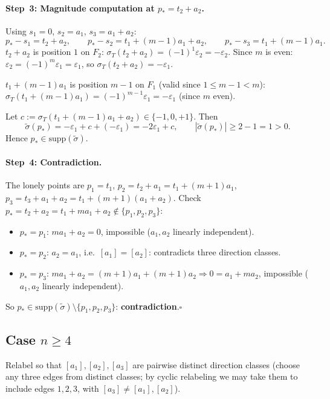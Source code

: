 \paragraph{Step~3: Magnitude computation at $p_*=t_2+a_2$.}
Using $s_1=0$, $s_2=a_1$, $s_3=a_1+a_2$:
\[
  p_*-s_1=t_2+a_2,\qquad
  p_*-s_2=t_1+(m{-}1)a_1+a_2,\qquad
  p_*-s_3=t_1+(m{-}1)a_1.
\]
$t_2+a_2$ is position $1$ on $F_2$: $\sigma_T(t_2+a_2)=(-1)^1\varepsilon_2=-\varepsilon_2$.
Since $m$ is even: $\varepsilon_2=(-1)^m\varepsilon_1=\varepsilon_1$, so $\sigma_T(t_2+a_2)=-\varepsilon_1$.

$t_1+(m-1)a_1$ is position $m-1$ on $F_1$ (valid since $1\le m-1<m$):
$\sigma_T(t_1+(m-1)a_1)=(-1)^{m-1}\varepsilon_1=-\varepsilon_1$ (since $m$ even).

Let $c:=\sigma_T(t_1+(m-1)a_1+a_2)\in\{-1,0,+1\}$.  Then
\[
  \tilde\sigma(p_*)=-\varepsilon_1+c+(-\varepsilon_1)=-2\varepsilon_1+c,
  \qquad|\tilde\sigma(p_*)|\ge2-1=1>0.
\]
Hence $p_*\in\mathrm{supp}(\tilde\sigma)$.

\paragraph{Step~4: Contradiction.}
The lonely points are $p_1=t_1$, $p_2=t_2+a_1=t_1+(m+1)a_1$,
$p_3=t_3+a_1+a_2=t_1+(m+1)(a_1+a_2)$.
Check $p_*=t_2+a_2=t_1+ma_1+a_2\notin\{p_1,p_2,p_3\}$:
\begin{itemize}
\item $p_*=p_1$: $ma_1+a_2=0$, impossible ($a_1,a_2$ linearly independent).
\item $p_*=p_2$: $a_2=a_1$, i.e.\ $[a_1]=[a_2]$: contradicts three direction classes.
\item $p_*=p_3$: $ma_1+a_2=(m+1)a_1+(m+1)a_2\Rightarrow0=a_1+ma_2$,
      impossible ($a_1,a_2$ linearly independent).
\end{itemize}
So $p_*\in\mathrm{supp}(\tilde\sigma)\setminus\{p_1,p_2,p_3\}$: \textbf{contradiction}.\hfill$\square$

\subsection*{Case $n\ge4$}

Relabel so that $[a_1],[a_2],[a_3]$ are pairwise distinct direction classes
(choose any three edges from distinct classes; by cyclic relabeling we may
take them to include edges $1,2,3$, with $[a_3]\ne[a_1],[a_2]$).

